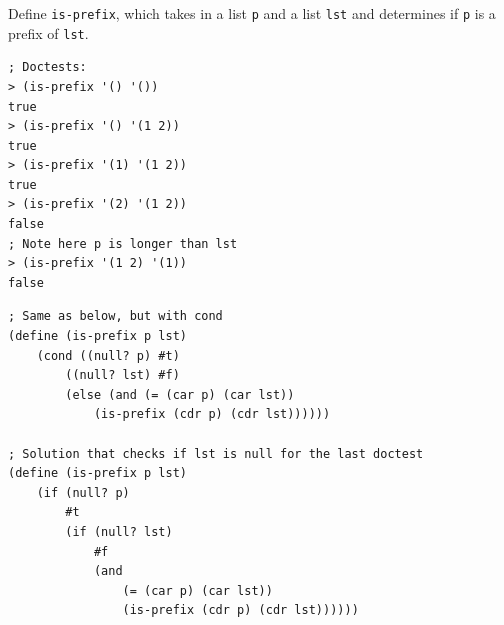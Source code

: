 \documentclass{exam}
\begin{document}
\begin{questions}
\begin{blocksection}
\question Define \texttt{is-prefix}, which takes in a list \texttt{p} and a list \texttt{lst} and determines if \texttt{p} is a prefix of \texttt{lst}.

\begin{lstlisting}
; Doctests:
> (is-prefix '() '())
true
> (is-prefix '() '(1 2))
true
> (is-prefix '(1) '(1 2))
true
> (is-prefix '(2) '(1 2))
false
; Note here p is longer than lst
> (is-prefix '(1 2) '(1))
false
\end{lstlisting}

\begin{solution}[0.5in]
\begin{lstlisting}
; Same as below, but with cond
(define (is-prefix p lst)
    (cond ((null? p) #t)
        ((null? lst) #f)
        (else (and (= (car p) (car lst))
            (is-prefix (cdr p) (cdr lst))))))

; Solution that checks if lst is null for the last doctest
(define (is-prefix p lst)
    (if (null? p)
        #t
        (if (null? lst)
            #f    
            (and 
                (= (car p) (car lst)) 
                (is-prefix (cdr p) (cdr lst))))))
\end{lstlisting}
\end{solution}
\end{blocksection}

\end{questions}

\end{document}
